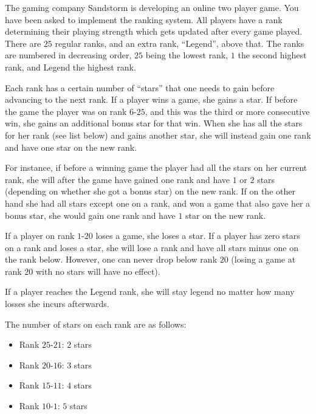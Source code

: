 
%
\noindent
The gaming company Sandstorm is developing an online two player game.
You have been asked to implement the ranking system.
All players have a rank determining their playing strength which gets updated after every game played.
There are $25$ regular ranks, and an extra rank, ``Legend'',
above that. The ranks are numbered in decreasing order, $25$ being the
lowest rank, $1$ the second highest rank, and Legend the highest rank.

Each rank has a certain number of ``stars'' that one needs to gain before advancing to the
next rank. If a player wins a game, she gains a star. If before the game the player was on rank $6$-$25$,
and this was the third or more consecutive win, she gains an additional bonus star for that win.
When she has all the stars for her rank (see list below) and gains another star, she 
will instead gain one rank and have one star on the new rank.

For instance, if before a winning game the player had all the stars on her current rank,
she will after the game have gained one rank and have $1$ or $2$ stars (depending on whether she got a bonus star)
on the new rank. If on the other hand she had all stars except one on a rank, and won
a game that also gave her a bonus star, she would gain one rank and have $1$ star on the new rank.

If a player on rank $1$-$20$ loses a game, she loses a star. If a player has zero stars on a
rank and loses a star, she will lose a rank and have all stars minus one on the rank below.
However, one can never drop below rank $20$ (losing a game at rank $20$ with no stars will have no effect).

If a player reaches the Legend rank, she will stay legend no matter how many losses she incurs afterwards.

The number of stars on each rank are as follows:
\begin{itemize}
\item Rank $25$-$21$: $2$ stars
\item Rank $20$-$16$: $3$ stars
\item Rank $15$-$11$: $4$ stars
\item Rank $10$-$1$: $5$ stars
\end{itemize}

